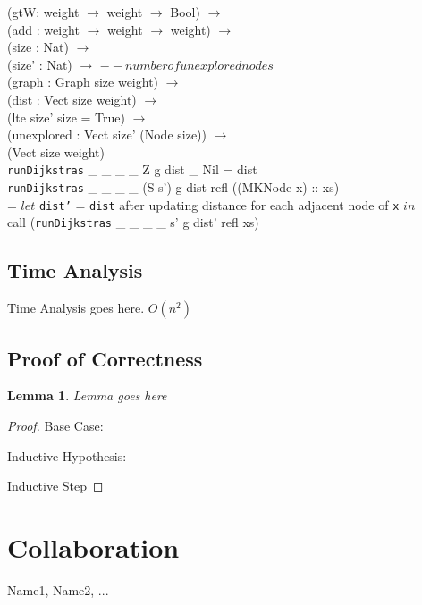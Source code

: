 \documentclass[11pt, oneside]{article}   	%
\newcommand\tab[1][1cm]{\hspace*{#1}}
\newtheorem*{lemma}{Lemma}
\begin{document}
            \tab\tab    (gtW: weight $\rightarrow$ weight $\rightarrow$ Bool) $\rightarrow$ \\
            \tab\tab    (add : weight $\rightarrow$ weight $\rightarrow$ weight) $\rightarrow$ \\
            \tab\tab    (size : Nat) $\rightarrow$ \\ 
            \tab\tab    (size' : Nat) $\rightarrow$ $-- number of unexplored nodes$ \\
            \tab\tab    (graph : Graph size weight) $\rightarrow$ \\
            \tab\tab    (dist : Vect size weight) $\rightarrow$ \\
            \tab\tab    (lte size' size = True) $\rightarrow$ \\ 
            \tab\tab    (unexplored : Vect size' (Node size)) $\rightarrow$ \\
            \tab\tab    (Vect size weight) \\
\texttt{runDijkstras} \_ \_ \_ \_ Z g dist \_ Nil = dist \\
\texttt{runDijkstras} \_ \_ \_ \_ (S s') g dist refl ((MKNode x) :: xs) \\
\tab = $let$ \texttt{dist'} = \texttt{dist} after updating distance for each adjacent node of \texttt{x} $in$ \\
\tab\tab call (\texttt{runDijkstras} \_ \_ \_ \_ s' g dist' refl xs)





\subsection{Time Analysis}
Time Analysis goes here. $O(n^2)$


\subsection{Proof of Correctness}
\begin{lemma}
Lemma goes here
\end{lemma}

\begin{proof}
Base Case:

Inductive Hypothesis:

Inductive Step
\end{proof}

\section*{Collaboration}
Name1, Name2, ...
\end{document}

